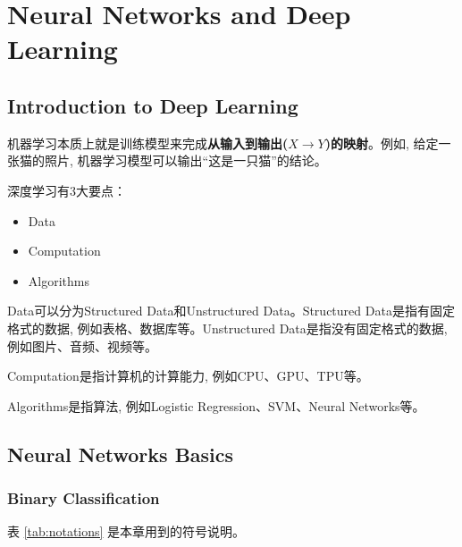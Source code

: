 \chapter{Neural Networks and Deep Learning}

	\section{Introduction to Deep Learning}
	机器学习本质上就是训练模型来完成\textbf{从输入到输出($X\to Y$)的映射}。例如, 给定一张猫的照片, 机器学习模型可以输出``这是一只猫''的结论。

	\vspace{0.5\baselineskip} %

	深度学习有3大要点：
	\begin{itemize}	
		\item Data
		\item Computation
		\item Algorithms
	\end{itemize}

	Data可以分为Structured Data和Unstructured Data。Structured Data是指有固定格式的数据, 例如表格、数据库等。Unstructured Data是指没有固定格式的数据, 例如图片、音频、视频等。

	Computation是指计算机的计算能力, 例如CPU、GPU、TPU等。

	Algorithms是指算法, 例如Logistic Regression、SVM、Neural Networks等。

	\section{Neural Networks Basics}
	
	\subsection{Binary Classification}

	表 \ref{tab:notations} 是本章用到的符号说明。

